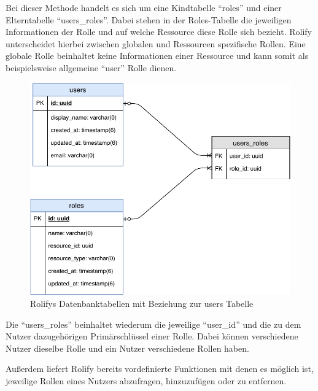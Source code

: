 Bei dieser Methode handelt es sich um eine Kindtabelle \enquote{roles} und einer Elterntabelle \enquote{users\_roles}. Dabei stehen in der Roles-Tabelle die jeweiligen Informationen der Rolle und auf welche Ressource diese Rolle sich bezieht. Rolify unterscheidet hierbei zwischen globalen und Ressourcen spezifische Rollen. Eine globale Rolle beinhaltet keine Informationen einer Ressource und kann somit als beispielsweise allgemeine \enquote{user} Rolle dienen.

\begin{figure}[h]
	\centering
	\includegraphics[width=.6\textwidth]{graphics/rolify.pdf}
	\caption{Rolifys Datenbanktabellen mit Beziehung zur users Tabelle}
	\label{fig:server-polymorph-association}
\end{figure}

Die \enquote{users\_roles} beinhaltet wiederum die jeweilige \enquote{user\_id} und die zu dem Nutzer dazugehörigen Primärschlüssel einer Rolle. Dabei können verschiedene Nutzer dieselbe Rolle und ein Nutzer verschiedene Rollen haben.

Außerdem liefert Rolify bereits vordefinierte Funktionen mit denen es möglich ist, jeweilige Rollen eines Nutzers abzufragen, hinzuzufügen oder zu entfernen.




